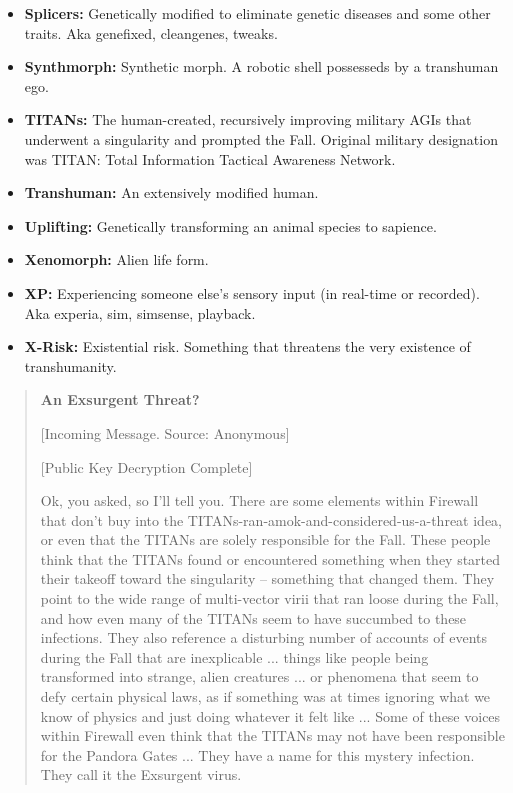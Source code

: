 \begin{itemize}
   \item \textbf{Splicers:} Genetically modified to eliminate genetic
      diseases and some other traits. Aka genefixed, cleangenes, tweaks.  

   \item \textbf{Synthmorph:} Synthetic morph. A robotic shell possesseds by
      a transhuman ego.

   \item \textbf{TITANs:} The human-created, recursively improving military
      AGIs that underwent a singularity and prompted the Fall. Original
      military designation was TITAN: Total Information Tactical Awareness
      Network.  

   \item \textbf{Transhuman:} An extensively modified human.

   \item \textbf{Uplifting:} Genetically transforming an animal species to
      sapience.  

   \item \textbf{Xenomorph:} Alien life form.  

   \item \textbf{XP:} Experiencing someone else's sensory input (in real-time
      or recorded). Aka experia, sim, simsense, playback.  

   \item \textbf{X-Risk:} Existential risk. Something that threatens the very
      existence of transhumanity.  
\end{itemize}

\begin{quote}
   \textbf{An Exsurgent Threat?}

   [Incoming Message. Source: Anonymous]

   [Public Key Decryption Complete]

   Ok, you asked, so I'll tell you. There are some elements within Firewall
   that don't buy into the TITANs-ran-amok-and-considered-us-a-threat idea,
   or even that the TITANs are solely responsible for the Fall. These people
   think that the TITANs found or encountered something when they started
   their takeoff toward the singularity -- something that changed them. They
   point to the wide range of multi-vector virii that ran loose during the
   Fall, and how even many of the TITANs seem to have succumbed to these
   infections. They also reference a disturbing number of accounts of events
   during the Fall that are inexplicable ... things like people being
   transformed into strange, alien creatures ... or phenomena that seem to
   defy certain physical laws, as if something was at times ignoring what we
   know of physics and just doing whatever it felt like ... Some of these
   voices within Firewall even think that the TITANs may not have been
   responsible for the Pandora Gates ... They have a name for this mystery
   infection. They call it the Exsurgent virus.
\end{quote}

